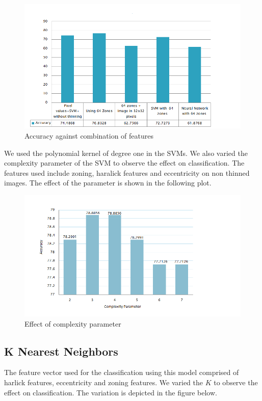 \documentclass[conference]{IEEEtran}
\begin{document}
\begin{figure}[h]
  \centering
    \includegraphics[scale = 0.4]{SVM_diff_2.png}
  \caption{Accuracy against combination of features }
\end{figure}

We used the polynomial kernel of degree one in the SVMs. We also varied the complexity parameter of the SVM to observe the effect on classification. The features used include zoning, haralick features and eccentricity on non thinned images. The effect of the parameter is shown in the following plot. 

\begin{figure}[h]
  \centering
    \includegraphics[scale = 0.4]{SVM_C_eff.png}
  \caption{Effect of complexity parameter }
\end{figure}

\subsection{K Nearest Neighbors}
The feature vector used for the classification using this model comprised of harlick features, eccentricity and zoning features. We varied the $K$ to observe the effect on classification. The variation is depicted in the figure below.
\end{document}
